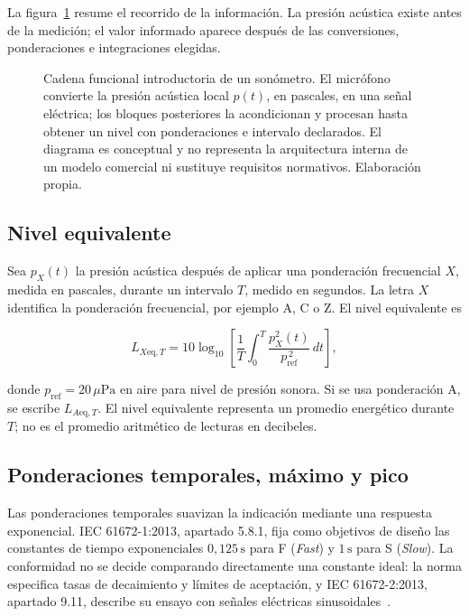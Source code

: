La figura~\ref{fig:u5-cadena-sonometro} resume el recorrido de la información.
La presión acústica existe antes de la medición; el valor informado aparece
después de las conversiones, ponderaciones e integraciones elegidas.

\begin{figure}[htbp]
    \centering
    
    \caption{Cadena funcional introductoria de un sonómetro. El micrófono
    convierte la presión acústica local \(p(t)\), en pascales, en una señal
    eléctrica; los bloques posteriores la acondicionan y procesan hasta obtener
    un nivel con ponderaciones e intervalo declarados. El diagrama es
    conceptual y no representa la arquitectura interna de un modelo comercial
    ni sustituye requisitos normativos. Elaboración propia.}
    \label{fig:u5-cadena-sonometro}
\end{figure}

\subsection{Nivel equivalente}
\label{sec:u5-leq}

Sea \(p_X(t)\) la presión acústica después de aplicar una ponderación
frecuencial \(X\), medida en pascales, durante un intervalo \(T\), medido en
segundos. La letra \(X\) identifica la ponderación frecuencial, por ejemplo A,
C o Z. El nivel equivalente es

\begin{equation}
    L_{X\mathrm{eq},T}
    =10\log_{10}
    \left[
        \frac{1}{T}
        \int_0^T
        \frac{p_X^2(t)}{p_\mathrm{ref}^{\,2}}\,dt
    \right],
    \label{eq:u5-leq}
\end{equation}

donde \(p_\mathrm{ref}=20\,\mu\text{Pa}\) en aire para nivel de presión
sonora. Si se usa ponderación A, se escribe \(L_{A\mathrm{eq},T}\). El nivel
equivalente representa un promedio energético durante \(T\); no es el promedio
aritmético de lecturas en decibeles.

\subsection{Ponderaciones temporales, máximo y pico}
\label{sec:u5-ponderaciones-temporales}

Las ponderaciones temporales suavizan la indicación mediante una respuesta
exponencial. IEC 61672-1:2013, apartado 5.8.1, fija como objetivos de diseño
las constantes de tiempo exponenciales \(0{,}125\,\text{s}\) para F
(\emph{Fast}) y \(1\,\text{s}\) para S (\emph{Slow}). La conformidad no se
decide comparando directamente una constante ideal: la norma especifica tasas
de decaimiento y límites de aceptación, y IEC 61672-2:2013, apartado 9.11,
describe su ensayo con señales eléctricas sinusoidales~\cite{iec61672_1_2013,iec61672_2_2013}.

